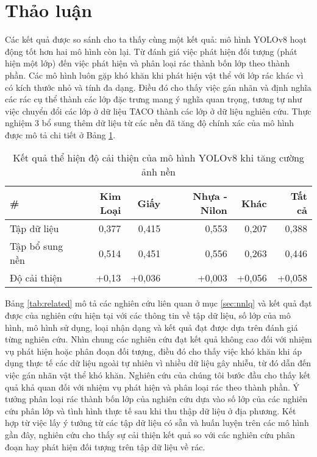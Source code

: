 \documentclass[../the.tex]{subfiles}
\begin{document}
\section{Thảo luận}
 {\fontsize{13}{12} \selectfont

  Các kết quả được so sánh cho ta thấy cùng một kết quả: mô hình YOLOv8 hoạt động tốt hơn hai mô hình còn lại.
  Từ đánh giá việc phát hiện đối tượng (phát hiện một lớp) đến việc phát hiện và phân loại rác thành bốn lớp theo thành phần.
  Các mô hình luôn gặp khó khăn khi phát hiện vật thể với lớp rác khác vì có kích thước nhỏ và tính đa dạng.
  Điều đó cho thấy việc gán nhãn và định nghĩa các rác cụ thể thành các lớp đặc trưng mang ý nghĩa quan trọng,
  tương tự như việc chuyển đổi các lớp ở dữ liệu TACO thành các lớp ở dữ liệu nghiên cứu.
  Thực nghiệm 3 bổ sung thêm dữ liệu từ các nền đã tăng độ chính xác của mô hình được mô tả chi tiết ở Bảng \ref{tab:thaoluan1}.

 }


\begin{table}[h!]
    \centering
    \caption{Kết quả thể hiện độ cải thiện của mô hình YOLOv8 khi tăng cường ảnh nền}
    \begin{tabular}{|l|r|r|r|r|r|}
        \hline
        \multicolumn{1}{|l|}{\textbf{\#}} & \textbf{Kim Loại} & \textbf{Giấy} & \textbf{Nhựa - Nilon} & \textbf{Khác} & \textbf{Tất cả} \\ \hline
        Tập dữ liệu                       & 0,377             & 0,415         & 0,553                 & 0,207         & 0,388           \\ \hline
        Tập bổ sung nền                 & 0,514             & 0,451         & 0,556                 & 0,263         & 0,446           \\ \hline
        Độ cải thiện                      & +0,13             & +0,036        & +0,003                & +0,056        & +0,058          \\ \hline
    \end{tabular}
    \label{tab:thaoluan1}
\end{table}


{\fontsize{13}{12} \selectfont

Bảng \ref{tab:related}
mô tả các nghiên cứu liên quan ở mục \ref{sec:nnlq} và kết quả đạt được của nghiên cứu hiện tại với các thông tin về tập dữ liệu, số lớp của mô hình, mô hình sử dụng, loại nhận dạng và kết quả đạt được dựa trên đánh giá từng nghiên cứu.
Nhìn chung các nghiên cứu đạt kết quả không cao đối với nhiệm vụ phát hiện hoặc phân đoạn đối tượng, điều đó cho thấy việc khó khăn khi áp dụng thực tế các dữ liệu ngoài tự nhiên vì nhiều dữ liệu gây nhiễu,
từ đó dẫn đến việc gán nhãn vật thể khó khăn.
Nghiên cứu của chúng tôi bước đầu cho thấy kết quả khả quan đối với nhiệm vụ phát hiện và phân loại rác theo thành phần.
Ý tưởng phân loại rác thành bốn lớp của nghiên cứu dựa vào số lớp của các nghiên cứu phân lớp và tình hình thực tế sau khi thu thập dữ liệu ở địa phương. Kết hợp từ việc lấy ý tưởng từ các tập dữ liệu có sẵn và huấn luyện trên các mô hình gần đây,
nghiên cứu cho thấy sự cải thiện kết quả so với các nghiên cứu phân đoạn hay phát hiện đối tượng trên tập dữ liệu về rác.

}
\end{document}
